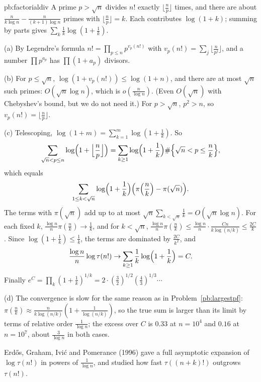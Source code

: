 \begin{solution}{pb:factorialdiv}
\idea A prime $p>\sqrt n$ divides $n!$ exactly $\lfloor\frac np\rfloor$ times, and there are about $\frac n{k\log n}-\frac n{(k+1)\log n}$ primes with $\lfloor\frac np\rfloor=k$. Each contributes
$\log(1+k)$; summing by parts gives $\sum_k\frac1k\log(1+\frac1k)$.

\writeup (a) By Legendre's formula $n!=\prod_{p\le n}p^{v_p(n!)}$ with $v_p(n!)=\sum_j\lfloor\frac n{p^j}\rfloor$, and a number $\prod p^{a_p}$ has $\prod(1+a_p)$ divisors.

(b) For $p\le\sqrt n$, $\log(1+v_p(n!))\le\log(1+n)$, and there are at most $\sqrt n$ such primes: $O(\sqrt n\log n)$, which is $o(\frac n{\log n})$. (Even $O(\sqrt n)$ with
Chebyshev's bound, but we do not need it.) For $p>\sqrt n$, $p^2>n$, so $v_p(n!)=\lfloor\frac np\rfloor$.

(c) Telescoping, $\log(1+m)=\sum_{k=1}^m\log(1+\frac1k)$. So
\[
\sum_{\sqrt n<p\le n}\log\Bigl(1+\Bigl\lfloor\frac np\Bigr\rfloor\Bigr)=\sum_{k\ge1}\log\Bigl(1+\frac1k\Bigr)\#\Bigl\{\sqrt n<p\le\frac nk\Bigr\},
\]
which equals
\[
\sum_{1\le k<\sqrt n}\log\Bigl(1+\frac1k\Bigr)\Bigl(\pi\Bigl(\frac nk\Bigr)-\pi(\sqrt n)\Bigr).
\]
The terms with $\pi(\sqrt n)$ add up to at most $\sqrt n\sum_{k<\sqrt n}\frac1k=O(\sqrt n\log n)$. For each fixed $k$, $\frac{\log n}n\pi(\frac nk)\to\frac1k$, and for $k<\sqrt n$,
$\frac{\log n}n\pi(\frac nk)\le\frac{\log n}n\cdot\frac{Cn}{k\log(n/k)}\le\frac{2C}k$. Since $\log(1+\frac1k)\le\frac1k$, the terms are dominated by $\frac{2C}{k^2}$, and
\[
\frac{\log n}n\log\tau(n!)\to\sum_{k\ge1}\frac1k\log\Bigl(1+\frac1k\Bigr)=C.
\]
Finally $e^C=\prod_k(1+\frac1k)^{1/k}=2\cdot(\frac32)^{1/2}(\frac43)^{1/3}\cdots$

(d) The convergence is slow for the same reason as in Problem~\ref{pb:largestpf}: $\pi(\frac nk)\approx\frac n{k\log(n/k)}(1+\frac1{\log(n/k)})$, so the true sum is larger than its limit
by terms of relative order $\frac1{\log n}$; the excess over $C$ is $0.33$ at $n=10^4$ and $0.16$ at $n=10^7$, about $\frac3{\log n}$ in both cases.

\leads Erd\H os, Graham, Ivi\'c and Pomerance (1996) gave a full asymptotic expansion of $\log\tau(n!)$ in powers of $\frac1{\log n}$, and studied how fast $\tau((n+k)!)$ outgrows $\tau(n!)$.
\end{solution}

